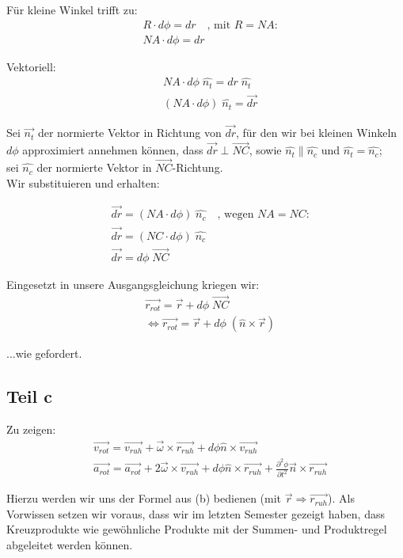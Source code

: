 \documentclass[a4paper,german,12pt,smallheadings]{scrartcl}
\begin{document}
Für kleine Winkel trifft zu:
\begin{align*}
& R\cdot {d\phi}=dr \quad \text{, mit $R=NA$:}\\
& NA\cdot {d\phi}=dr
\end{align*}

Vektoriell:
\begin{align*}
& NA\cdot {d\phi} \; \hat{n_t}=dr \; \hat{n_t}\\
& (NA\cdot {d\phi}) \; \hat{n_t}=\vec{dr}
\end{align*}

Sei $\vec{n_t}$ der normierte Vektor in Richtung von $\vec{dr}$, für den wir bei kleinen Winkeln $d\phi$ approximiert annehmen können, dass $\vec{dr}\perp\vec{NC}$, sowie $\hat{n_t}\parallel\hat{n_c}$ und $\hat{n_t}=\hat{n_c}$;\\
sei $\hat{n_c}$ der normierte Vektor in $\vec{NC}$-Richtung.\\
Wir substituieren und erhalten:

\begin{align*}
& \vec{dr}=\left(NA \cdot d\phi\right) \; \hat{n_c} \quad \text{, wegen $NA=NC$:}\\
& \vec{dr}=\left(NC \cdot d\phi\right) \; \hat{n_c}\\
& \vec{dr}=d\phi \; \vec{NC}
\end{align*}

Eingesetzt in unsere Ausgangsgleichung kriegen wir:
\begin{align*}
& \vec{r_{rot}}=\vec{r}+d\phi \; \vec{NC}\\
& \Leftrightarrow \vec{r_{rot}}=\vec{r}+d\phi \; (\hat{n} \times \vec{r})
\end{align*}

...wie gefordert.

\subsection*{Teil c}

Zu zeigen:
\begin{align*}
& \vec{v_{rot}}=\vec{v_{ruh}}+\vec{\omega} \times \vec{r_{ruh}}+d\phi\hat{n} \times \vec{v_{ruh}}\\
& \vec{a_{rot}}=\vec{a_{rot}}+2\vec{\omega} \times \vec{v_{ruh}}+d\phi \hat{n} \times \vec{r_{ruh}}+\frac{\partial^2 \phi}{\partial t^2}\vec{n} \times \vec{r_{ruh}}
\end{align*}

Hierzu werden wir uns der Formel aus (b) bedienen (mit $\vec{r}\Rightarrow\vec{r_{ruh}}$). Als Vorwissen setzen wir voraus, dass wir im letzten Semester gezeigt haben, dass Kreuzprodukte wie gewöhnliche Produkte mit der Summen- und Produktregel abgeleitet werden können.\\
\end{document}

